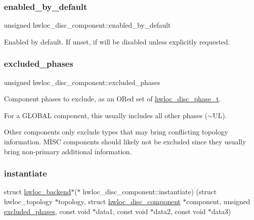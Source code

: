 \subsubsection{\texorpdfstring{enabled\+\_\+by\+\_\+default}{enabled\_by\_default}}
{\footnotesize\ttfamily unsigned hwloc\+\_\+disc\+\_\+component\+::enabled\+\_\+by\+\_\+default}



Enabled by default. If unset, if will be disabled unless explicitly requested. 

\mbox{\label{a00366_acbb9957914dbf7b8f504215aa0c8d3fe}} 
\subsubsection{\texorpdfstring{excluded\+\_\+phases}{excluded\_phases}}
{\footnotesize\ttfamily unsigned hwloc\+\_\+disc\+\_\+component\+::excluded\+\_\+phases}



Component phases to exclude, as an OR\textquotesingle{}ed set of \hyperlink{a00228_ga3beef9f01f1c08c5700aec066fcec025}{hwloc\+\_\+disc\+\_\+phase\+\_\+t}. 

For a G\+L\+O\+B\+AL component, this usually includes all other phases ({\ttfamily $\sim$\+UL}).

Other components only exclude types that may bring conflicting topology information. M\+I\+SC components should likely not be excluded since they usually bring non-\/primary additional information. \mbox{\label{a00366_ab133956219739a1032a17131757d1961}} 
\subsubsection{\texorpdfstring{instantiate}{instantiate}}
{\footnotesize\ttfamily struct \hyperlink{a00374}{hwloc\+\_\+backend}$\ast$($\ast$ hwloc\+\_\+disc\+\_\+component\+::instantiate) (struct hwloc\+\_\+topology $\ast$topology, struct \hyperlink{a00366}{hwloc\+\_\+disc\+\_\+component} $\ast$component, unsigned \hyperlink{a00366_acbb9957914dbf7b8f504215aa0c8d3fe}{excluded\+\_\+phases}, const void $\ast$data1, const void $\ast$data2, const void $\ast$data3)}



